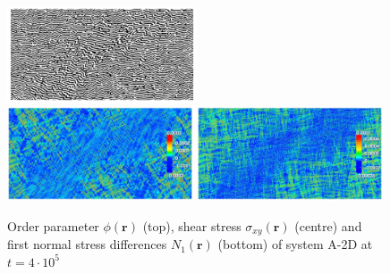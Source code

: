 \documentclass[8.5pt,twoside,twocolumn]{article}
\newcommand{\e}[1]{\cdot10^{#1}}
\begin{document}
\begin{figure}[htp!]
\centering
\hspace*{-0.1cm}\includegraphics[angle=0,width=0.5\textwidth]{phi_run704_400.jpg}
\includegraphics[angle=0,width=0.49\textwidth]{shear_str_run704_400.jpg}
\includegraphics[angle=0,width=0.49\textwidth]{N1_run704_400.jpg}
\caption{Order parameter $\phi({\mathbf r})$ (top), shear stress $\sigma_{xy}({\mathbf r})$ (centre) and first normal stress differences $N_1({\mathbf r})$ (bottom) of system A-2D at $t=4\e{5}$}
\label{fig3}
\end{figure}
\end{document}
